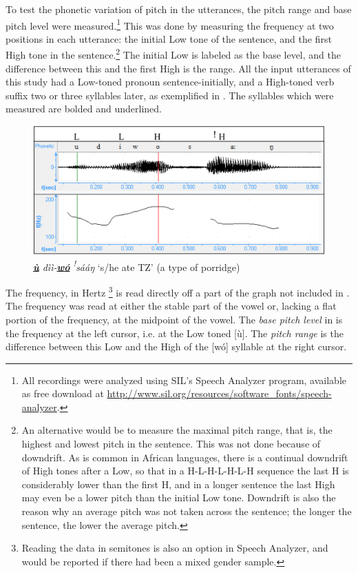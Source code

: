 \documentclass[output=paper]{langsci/langscibook}
\begin{document}
To test the phonetic variation of pitch in the utterances, the pitch range and base pitch level were measured.\footnote{All recordings were analyzed using SIL's Speech Analyzer program, available as free download at \url{http://www.sil.org/resources/software_fonts/speech-analyzer}.} This was done by measuring the frequency at two positions in each utterance: the initial Low tone of the sentence, and the first High tone in the sentence.\footnote{An alternative would be to measure the maximal pitch range, that is, the highest and lowest pitch in the sentence. This was not done because of downdrift. As is common in African languages, there is a continual downdrift of High tones after a Low, so that in a H-L-H-L-H-L-H sequence the last H is considerably lower than the first H, and in a longer sentence the last High may even be a lower pitch than the initial Low tone. Downdrift is also the reason why an average pitch was not taken across the sentence; the longer the sentence, the lower the average pitch.} The initial Low is labeled as the base level, and the difference between this and the first High is the range. All the input utterances of this study had a Low-toned pronoun sentence-initially, and a High-toned verb suffix two or three syllables later, as exemplified in . The syllables which were measured are bolded and underlined.


\begin{figure}[h]
\includegraphics[width=\textwidth]{figures/cahillfig1}
\caption{\textit{\textbf{\underline{ù}} dìì-\textbf{\underline{wó}} \textit{\textsuperscript{!}}sááŋ}  `s/he ate TZ' (a type of porridge)}
\label{fig:1.cahill}
\end{figure}



The frequency, in Hertz \footnote{Reading the data in semitones is also an option in Speech Analyzer, and would be reported if there had been a mixed gender sample.} is read directly off a part of the graph not included in . The frequency was read at either the stable part of the vowel or, lacking a flat portion of the frequency, at the midpoint of the vowel.  The \emph{base pitch level} in  is the frequency at the left cursor, i.e. at the Low toned [ù]. The \emph{pitch range} is the difference between this Low and the High of the [wó] syllable at the right cursor. 
\end{document}
